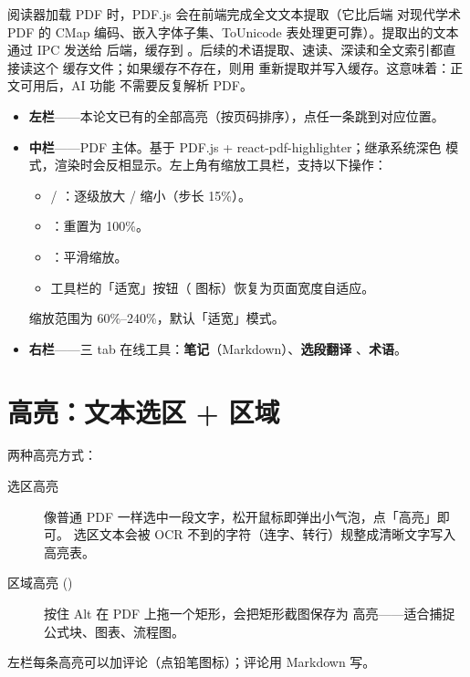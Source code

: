 阅读器加载 PDF 时，PDF.js 会在前端完成全文文本提取（它比后端  对现代学术
PDF 的 CMap 编码、嵌入字体子集、ToUnicode 表处理更可靠）。提取出的文本通过 IPC 发送给
后端，缓存到 。后续的术语提取、速读、深读和全文索引都直接读这个
缓存文件；如果缓存不存在，则用  重新提取并写入缓存。这意味着：正文可用后，AI 功能
不需要反复解析 PDF。



\begin{itemize}
  \item \textbf{左栏}——本论文已有的全部高亮（按页码排序），点任一条跳到对应位置。
  \item \textbf{中栏}——PDF 主体。基于 PDF.js + react-pdf-highlighter；继承系统深色
    模式，渲染时会反相显示。左上角有缩放工具栏，支持以下操作：
    \begin{itemize}
      \item {} / ：逐级放大 / 缩小（步长 15\%）。
      \item {}：重置为 100\%。
      \item {}：平滑缩放。
      \item 工具栏的「适宽」按钮（ 图标）恢复为页面宽度自适应。
    \end{itemize}
    缩放范围为 60\%--240\%，默认「适宽」模式。
  \item \textbf{右栏}——三 tab 在线工具：\textbf{笔记}（Markdown）、\textbf{选段翻译}
    、\textbf{术语}。
\end{itemize}

\section{高亮：文本选区 + 区域}

两种高亮方式：

\begin{description}
  \item[选区高亮] 像普通 PDF 一样选中一段文字，松开鼠标即弹出小气泡，点「高亮」即可。
    选区文本会被 OCR 不到的字符（连字、转行）规整成清晰文字写入高亮表。
  \item[区域高亮 ()] 按住 Alt 在 PDF 上拖一个矩形，会把矩形截图保存为
    高亮——适合捕捉公式块、图表、流程图。
\end{description}

左栏每条高亮可以加评论（点铅笔图标）；评论用 Markdown 写。

